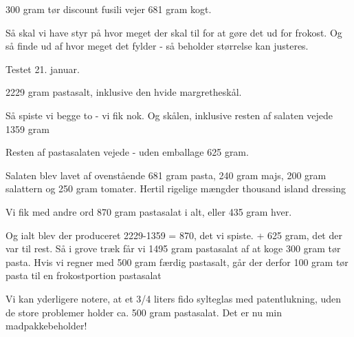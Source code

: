\documentclass[
]{book}
\begin{document}
300 gram tør discount fusili vejer
681 gram kogt.

Så skal vi have styr på hvor meget der skal til for at gøre det ud for frokost. Og så
finde ud af hvor meget det fylder - så beholder størrelse kan justeres.

Testet 21. januar.

2229 gram pastasalt, inklusive den hvide margretheskål.

Så spiste vi begge to - vi fik nok. Og skålen, inklusive
resten af salaten vejede 1359 gram

Resten af pastasalaten vejede - uden emballage 625 gram.

Salaten blev lavet af ovenstående 681 gram pasta, 240 gram
majs, 200 gram salattern og 250 gram tomater. Hertil rigelige
mængder thousand island dressing

Vi fik med andre ord 870 gram pastasalat i alt, eller 435 gram hver.

Og ialt blev der produceret
2229-1359 = 870, det vi spiste.
+ 625 gram, det der var til rest.
Så i grove træk får vi 1495 gram pastasalat af at koge 300 gram
tør pasta. Hvis vi regner med 500 gram færdig pastasalt,
går der derfor 100 gram tør pasta til en frokostportion pastasalat

Vi kan yderligere notere, at et 3/4 liters fido sylteglas med
patentlukning, uden de store problemer holder ca. 500 gram
pastasalat. Det er nu min madpakkebeholder!
\end{document}
